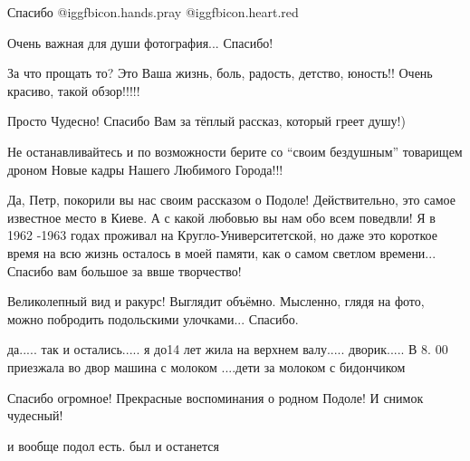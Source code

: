 \begin{itemize}
Спасибо @igg{fbicon.hands.pray} @igg{fbicon.heart.red}

Очень важная для души фотография...
Спасибо!

За что прощать то? Это Ваша жизнь, боль, радость, детство, юность!! Очень
красиво, такой обзор!!!!!



Просто Чудесно! Спасибо Вам за тёплый рассказ, который греет душу!)

Не останавливайтесь и по возможности берите со \enquote{своим бездушным} товарищем
дроном Новые кадры Нашего Любимого Города!!!


Да, Петр, покорили вы нас своим рассказом о Подоле! Действительно, это самое
известное место в Киеве. А с какой любовью вы нам обо всем поведвли! Я в 1962
-1963 годах проживал на Кругло-Университетской, но даже это короткое время на
всю жизнь осталось в моей памяти, как о самом светлом времени... Спасибо вам
большое за ввше творчество!


Великолепный вид и ракурс! Выглядит объёмно. Мысленно, глядя на фото, можно
побродить подольскими улочками... Спасибо.


да..... так и остались..... я до14 лет жила на верхнем валу..... дворик..... В 8. 00
приезжала во двор машина с молоком ....дети за молоком с бидончиком

Спасибо огромное! Прекрасные воспоминания о родном Подоле! И снимок чудесный!

и вообще подол есть. был и останется


\end{itemize} %
